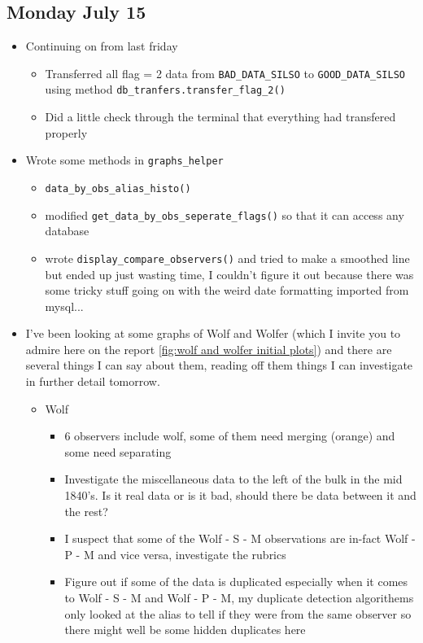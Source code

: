 \documentclass[12pt]{article}
\begin{document}
\subsection{Monday July 15}
\begin{itemize}
    \item Continuing on from last friday
    \begin{itemize}
        \item Transferred all flag = 2 data from \texttt{BAD\_DATA\_SILSO} to \texttt{GOOD\_DATA\_SILSO} using method \texttt{db\_tranfers.transfer\_flag\_2()}
        \item Did a little check through the terminal that everything had transfered properly
    \end{itemize}
    \item Wrote some methods in \texttt{graphs\_helper}
    \begin{itemize}
        \item \texttt{data\_by\_obs\_alias\_histo()}
        \item modified \texttt{get\_data\_by\_obs\_seperate\_flags()} so that it can access any database
        \item wrote \texttt{display\_compare\_observers()} and tried to make a smoothed line but ended up just wasting time, I couldn't figure it out because there was some tricky stuff going on with the weird date formatting imported from mysql...
    \end{itemize}
    \item I've been looking at some graphs of Wolf and Wolfer (which I invite you to admire here on the report \ref{fig:wolf and wolfer initial plots}) and there are several things I can say about them, reading off them things I can investigate in further detail tomorrow.
    \begin{itemize}
        \item Wolf
        \begin{itemize}
            \item 6 observers include wolf, some of them need merging (orange) and some need separating
            \item Investigate the miscellaneous data to the left of the bulk in the mid 1840's. Is it real data or is it bad, should there be data between it and the rest?
            \item I suspect that some of the Wolf - S - M observations are in-fact Wolf - P - M and vice versa, investigate the rubrics
            \item Figure out if some of the data is duplicated especially when it comes to Wolf - S - M and Wolf - P - M, my duplicate detection algorithems only looked at the alias to tell if they were from the same observer so there might well be some hidden duplicates here

\end{itemize}
\end{itemize}
\end{itemize}
\end{document}

